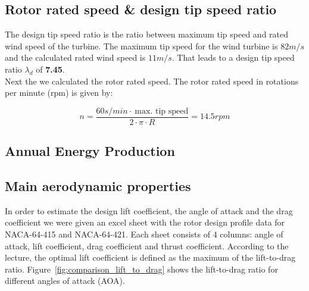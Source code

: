 \documentclass[10pt]{article}
\begin{document}
\subsection{Rotor rated speed \& design tip speed ratio}
The design tip speed ratio is the ratio between maximum tip speed and rated wind speed of the turbine. The maximum tip speed for the wind turbine is $82 m/s$ and the calculated rated wind speed is $11 m/s$. That leads to a design tip speed ratio $\lambda_d$ of \textbf{7.45}.\\
Next the we calculated the rotor rated speed. The rotor rated speed in rotations per minute (rpm) is given by:

\begin{equation}
n = \frac{60s/min \cdot\ \text{max. tip speed}}{2\cdot\pi\cdot R} = 14.5 rpm
\end{equation}
\subsection{Annual Energy Production}
\subsection{Main aerodynamic properties}
In order to estimate the design lift coefficient, the angle of attack and the drag coefficient we were given an excel sheet with the rotor design profile data for NACA-64-415 and NACA-64-421.
Each sheet consists of 4 columns: angle of attack, lift coefficient, drag coefficient and thrust coefficient. According to the lecture, the optimal lift coefficient is defined as the maximum of the lift-to-drag ratio. Figure~\ref{fig:comparison_lift_to_drag} shows the lift-to-drag ratio for different angles of attack (AOA).
\end{document}
